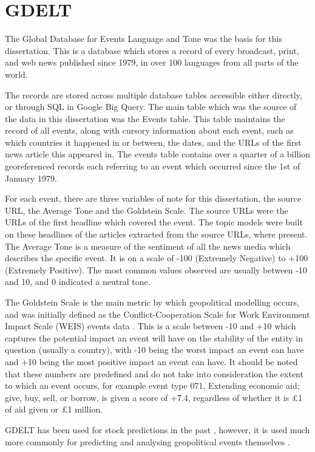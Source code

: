 \section{GDELT}
\label{gdelt}

The Global Database for Events Language and Tone was the basis for this dissertation. This is a database which stores a record of every broadcast, print, and web news published since 1979, in over 100 languages from all parts of the world. 

The records are stored across multiple database tables accessible either directly, or through SQL in Google Big Query. The main table which was the source of the data in this dissertation was the Events table. This table maintains the record of all events, along with cursory information about each event, such as which countries it happened in or between, the dates, and the URLs of the first news article this appeared in. The events table contains over a quarter of a billion georeferenced records each referring to an event which occurred since the 1st of January 1979. 

For each event, there are three variables of note for this dissertation, the source URL, the Average Tone and the Goldstein Scale. The source URLs were the URLs of the first headline which covered the event. The topic models were built on these headlines of the articles extracted from the source URLs, where present. The Average Tone is a measure of the sentiment of all the news media which describes the specific event. It is on a scale of -100 (Extremely Negative) to +100 (Extremely Positive). The most common values observed are usually between -10 and 10, and 0 indicated a neutral tone. 

The Goldstein Scale is the main metric by which geopolitical modelling occurs, and was initially defined as the Conflict-Cooperation Scale for Work Environment Impact Scale (WEIS) events data \cite{goldstein1992conflict}. This is a scale between -10 and +10 which captures the potential impact an event will have on the stability of the entity in question (usually a country), with -10 being the worst impact an event can have and +10 being the most positive impact an event can have. It should be noted that these numbers are predefined and do not take into consideration the extent to which an event occurs, for example event type 071, Extending economic aid; give, buy, sell, or borrow, is given a score of +7.4, regardless of whether it is £1 of aid given or £1 million. 

GDELT has been used for stock predictions in the past \cite{memari2017predicting} \cite{alamro2019predicting}, however, it is used much more commonly for predicting and analysing geopolitical events themselves \cite{qiao2017predicting} \cite{yonamine2013predicting}. 
